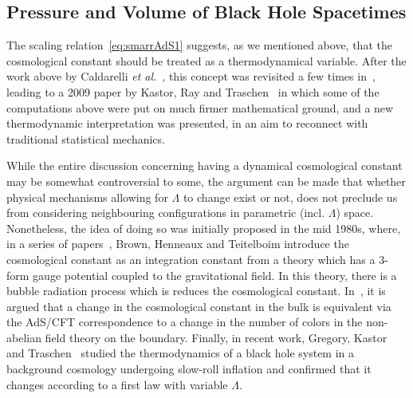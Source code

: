 \documentclass[
twoside,
openright,
frontopenright,
]{dmathesis}
\begin{document}
\subsection{Pressure and Volume of Black Hole Spacetimes}
\label{sec:press-volume-black}

The scaling relation~\eqref{eq:smarrAdS1} suggests, as we mentioned above, that
the cosmological constant should be treated as a thermodynamical variable. After
the work above by Caldarelli \emph{et al.}~\cite{Caldarelli:1999xj}, this
concept was revisited a few times
in~\cite{Wang:2006eb,Sekiwa:2006qj,Wang:2006bn,LarranagaRubio:2007fly}, leading
to a 2009 paper by Kastor, Ray and Traschen~\cite{Kastor:2009wy} in which some
of the computations above were put on much firmer mathematical ground, and a
new thermodynamic interpretation was presented, in an aim to reconnect with
traditional statistical mechanics.

While the entire discussion concerning having a dynamical cosmological constant
may be somewhat controversial to some, the argument can be made that whether
physical mechanisms allowing for $\Lambda$ to change exist or not, does not
preclude us from considering neighbouring configurations in parametric
(incl. $\Lambda$) space. Nonetheless, the idea of doing so was initially
proposed in the mid 1980s, where, in a series of papers~\cite{Henneaux:1984ji,
  Teitelboim:1985dp, Henneaux:1985tv, Brown:1987dd, Brown:1988kg,
  Henneaux:1989zc}, Brown, Henneaux and Teitelboim introduce the cosmological
constant as an integration constant from a theory which has a 3-form gauge
potential coupled to the gravitational field. In this theory, there is a bubble
radiation process which is reduces the cosmological
constant. In~\cite{Kastor:2009wy}, it is argued that a change in the
cosmological constant in the bulk is equivalent via the AdS/CFT correspondence
to a change in the number of colors in the non-abelian field theory on the
boundary. Finally, in recent work, Gregory, Kastor and
Traschen~\cite{Gregory:2017sor,Gregory:2018ghc} studied the thermodynamics of a
black hole system in a background cosmology undergoing slow-roll inflation and
confirmed that it changes according to a first law with variable $\Lambda$.
\end{document}
